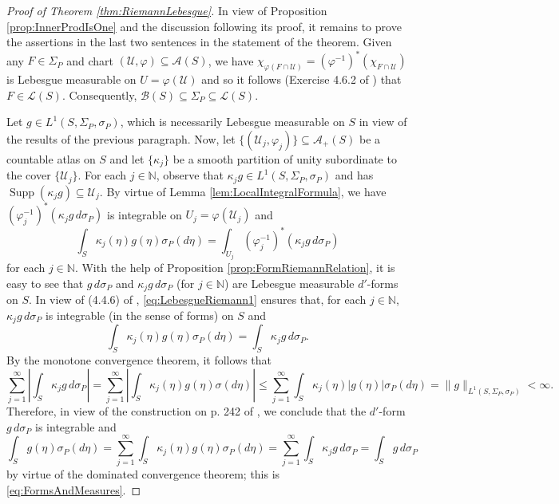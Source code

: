 \documentclass[11pt, letter]{book}
\newcommand\supp{\operatorname{Supp}}
\begin{document}
\begin{proof}[Proof of Theorem \ref{thm:RiemannLebesgue}]
In view of Proposition \ref{prop:InnerProdIsOne} and the discussion following its proof, it remains to prove the assertions in the last two sentences in the statement of the theorem. Given any $F\in \Sigma_P$ and chart $(\mathcal{U},\varphi)\subseteq \mathcal{A}(S)$, we have $\chi_{\varphi(F\cap \mathcal{U})}=(\varphi^{-1})^*\left(\chi_{F\cap\mathcal{U}}\right)$ is Lebesgue measurable on $U=\varphi(\mathcal{U})$ and so it follows (Exercise 4.6.2 of \cite{naber_topology_2011}) that $F\in\mathcal{L}(S)$. Consequently, $\mathcal{B}(S)\subseteq\Sigma_P\subseteq\mathcal{L}(S)$.

Let $g\in L^1(S,\Sigma_P,\sigma_P)$, which is necessarily Lebesgue measurable on $S$ in view of the results of the previous paragraph. Now, let  $\{(\mathcal{U}_j,\varphi_j)\}\subseteq\mathcal{A}_+(S)$ be a countable atlas on $S$ and let $\{\kappa_j\}$ be a smooth partition of unity subordinate to the cover $\{\mathcal{U}_j\}$. For each $j\in\mathbb{N}$, observe that $\kappa_j g\in L^1(S,\Sigma_P,\sigma_P)$ and has $\supp(\kappa_j g)\subseteq \mathcal{U}_j$. By virtue of Lemma \ref{lem:LocalIntegralFormula}, we have $(\varphi_j^{-1})^*(\kappa_j g\,d\sigma_P)$ is integrable on $U_j=\varphi(\mathcal{U}_j)$ and
\begin{equation}\label{eq:LebesgueRiemann1}
\int_S \kappa_j(\eta)g(\eta)\sigma_P(d\eta)=\int_{U_j}(\varphi_j^{-1})^*(\kappa_j g\,d\sigma_P)
\end{equation}
for each $j\in\mathbb{N}$. With the help of Proposition \ref{prop:FormRiemannRelation}, it is easy to see that $g\,d\sigma_P$ and $\kappa_j g\,d\sigma_P$ (for $j\in\mathbb{N}$) are Lebesgue measurable $d'$-forms on $S$. In view of (4.4.6) of \cite{naber_topology_2011}, \eqref{eq:LebesgueRiemann1} ensures that, for each $j\in\mathbb{N}$, $\kappa_j g\,d\sigma_P$ is integrable (in the sense of forms) on $S$ and
\begin{equation*}
\int_S \kappa_j(\eta)g(\eta)\sigma_P(d\eta)=\int_S \kappa_j g\,d\sigma_P.
\end{equation*}
By the monotone convergence theorem, it follows that
\begin{equation*}
\sum_{j=1}^\infty\left| \int_S \kappa_j g\,d\sigma_P\right|=\sum_{j=1}^\infty \left|\int_S \kappa_j(\eta)g(\eta)\sigma(d\eta)\right|\leq \sum_{j=1}^\infty\int_S \kappa_j(\eta)|g(\eta)|\sigma_P(d\eta)=\|g\|_{L^1(S,\Sigma_P,\sigma_P)}<\infty.
\end{equation*}
Therefore, in view of the construction on p. 242 of \cite{naber_topology_2011}, we conclude that the $d'$-form $g\,d\sigma_P$ is integrable and
\begin{equation*}
\int_S g(\eta)\sigma_P(d\eta)=\sum_{j=1}^\infty \int_S \kappa_j(\eta)g(\eta)\sigma_P(d\eta)=\sum_{j=1}^\infty \int_{S} \kappa_j g\,d\sigma_P=\int_S g\,d\sigma_P
\end{equation*}
by virtue of the dominated convergence theorem; this is \eqref{eq:FormsAndMeasures}.


\end{proof}
\end{document}
